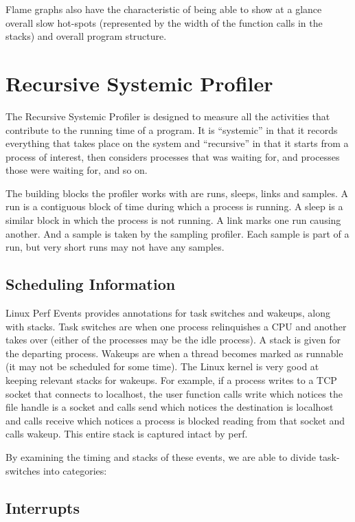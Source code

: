 \documentclass{article}
\begin{document}
Flame graphs also have the characteristic of being able to show at a glance overall slow hot-spots (represented by the width of the function calls in the stacks) and overall program structure.


\section{Recursive Systemic Profiler}

The Recursive Systemic Profiler is designed to measure all the activities that contribute to the running time of a program.  It is ``systemic'' in that it records everything that takes place on the system and ``recursive'' in that it starts from a process of interest, then considers processes that was waiting for, and processes those were waiting for, and so on.

The building blocks the profiler works with are runs, sleeps, links and samples.  A run is a contiguous block of time during which a process is running.  A sleep is a similar block in which the process is not running.  A link marks one run causing another.  And a sample is taken by the sampling profiler.  Each sample is part of a run, but very short runs may not have any samples.

\subsection{Scheduling Information}

Linux Perf Events provides annotations for task switches and wakeups, along with stacks.  Task switches are when one process relinquishes a CPU and another takes over (either of the processes may be the idle process).  A stack is given for the departing process.  Wakeups are when a thread becomes marked as runnable (it may not be scheduled for some time).  The Linux kernel is very good at keeping relevant stacks for wakeups.  For example, if a process writes to a TCP socket that connects to localhost, the user function calls write which notices the file handle is a socket and calls send which notices the destination is localhost and calls receive which notices a process is blocked reading from that socket and calls wakeup.  This entire stack is captured intact by perf.

By examining the timing and stacks of these events, we are able to divide task-switches into categories:

\subsection{Interrupts}
\end{document}
